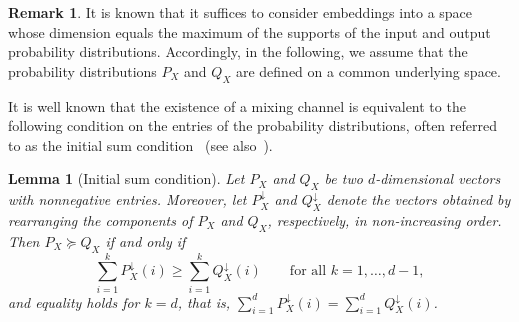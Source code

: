 \documentclass[aps,pra,11pt,onecolumn,nofootinbib,tightenlines]{revtex4-2}
\newtheorem{lemma}[theorem]{Lemma}
\theoremstyle{definition}
\newtheorem{remark}[theorem]{Remark}
\begin{document}
\begin{remark}
    It is known that it suffices to consider embeddings into a space whose dimension equals the maximum of the supports of the input and output probability distributions. Accordingly, in the following, we assume that the probability distributions $P_X$ and $Q_X$ are defined on a common underlying space. 
\end{remark}
It is well known that the existence of a mixing channel is equivalent to the following condition on the entries of the probability distributions, often referred to as the initial sum condition~\cite{birkhoff1946tres} (see also~\cite{marshall1979inequalities}).
\begin{lemma}[Initial sum condition]
\label{lem: Initial sum condition}
Let \( P_X \) and \( Q_X \) be two $d$-dimensional vectors with nonnegative entries. Moreover, let \( P_X^{\downarrow} \) and \( Q_X^{\downarrow} \) denote the vectors obtained by rearranging the components of \( P_X \) and \( Q_X \), respectively, in non-increasing order. Then \( P_X \succeq Q_X \) if and only if
\begin{equation}
    \sum_{i=1}^{k} P_X^{\downarrow}(i) \geq \sum_{i=1}^{k} Q_X^{\downarrow}(i) \qquad \text{for all } k = 1, \ldots, d-1,
\end{equation}
and equality holds for \( k = d \), that is, $\sum_{i=1}^{d} P_X^{\downarrow}(i) = \sum_{i=1}^{d} Q_X^{\downarrow}(i)$.
\end{lemma}
\end{document}

